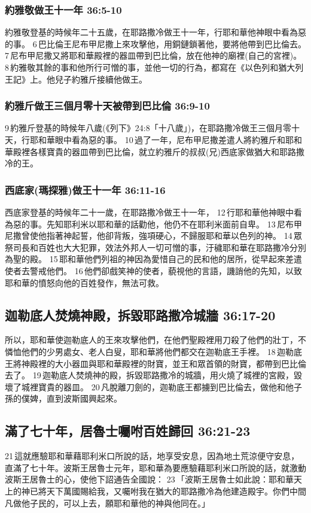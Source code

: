 \subsubsection{約雅敬做王十一年 36:5-10}
約雅敬登基的時候年二十五歲，在耶路撒冷做王十一年，行耶和華他神眼中看為惡的事。 6 巴比倫王尼布甲尼撒上來攻擊他，用銅鏈鎖著他，要將他帶到巴比倫去。 7 尼布甲尼撒又將耶和華殿裡的器皿帶到巴比倫，放在他神的廟裡(自己的宮裡)。 8 約雅敬其餘的事和他所行可憎的事，並他一切的行為，都寫在《以色列和猶大列王記》上。他兒子約雅斤接續他做王。

\subsubsection{約雅斤做王三個月零十天被帶到巴比倫 36:9-10 }
9 約雅斤登基的時候年八歲(《列下》24:8「十八歲」)，在耶路撒冷做王三個月零十天，行耶和華眼中看為惡的事。 10 過了一年，尼布甲尼撒差遣人將約雅斤和耶和華殿裡各樣寶貴的器皿帶到巴比倫，就立約雅斤的叔叔(兄)西底家做猶大和耶路撒冷的王。




\subsubsection{西底家(瑪探雅)做王十一年 36:11-16}
西底家登基的時候年二十一歲，在耶路撒冷做王十一年， 12 行耶和華他神眼中看為惡的事。先知耶利米以耶和華的話勸他，他仍不在耶利米面前自卑。 13 尼布甲尼撒曾使他指著神起誓，他卻背叛，強項硬心，不歸服耶和華以色列的神。 14 眾祭司長和百姓也大大犯罪，效法外邦人一切可憎的事，汙穢耶和華在耶路撒冷分別為聖的殿。 15 耶和華他們列祖的神因為愛惜自己的民和他的居所，從早起來差遣使者去警戒他們。 16 他們卻戲笑神的使者，藐視他的言語，譏誚他的先知，以致耶和華的憤怒向他的百姓發作，無法可救。

\subsection{迦勒底人焚燒神殿，拆毀耶路撒冷城牆 36:17-20}
所以，耶和華使迦勒底人的王來攻擊他們，在他們聖殿裡用刀殺了他們的壯丁，不憐恤他們的少男處女、老人白叟，耶和華將他們都交在迦勒底王手裡。 18 迦勒底王將神殿裡的大小器皿與耶和華殿裡的財寶，並王和眾首領的財寶，都帶到巴比倫去了。 19 迦勒底人焚燒神的殿，拆毀耶路撒冷的城牆，用火燒了城裡的宮殿，毀壞了城裡寶貴的器皿。 20 凡脫離刀劍的，迦勒底王都擄到巴比倫去，做他和他子孫的僕婢，直到波斯國興起來。 

\subsection{滿了七十年，居魯士囑咐百姓歸回 36:21-23 }
21 這就應驗耶和華藉耶利米口所說的話，地享受安息，因為地土荒涼便守安息，直滿了七十年。波斯王居魯士元年，耶和華為要應驗藉耶利米口所說的話，就激動波斯王居魯士的心，使他下詔通告全國說： 23 「波斯王居魯士如此說：耶和華天上的神已將天下萬國賜給我，又囑咐我在猶大的耶路撒冷為他建造殿宇。你們中間凡做他子民的，可以上去，願耶和華他的神與他同在。」




















	 
  






  
